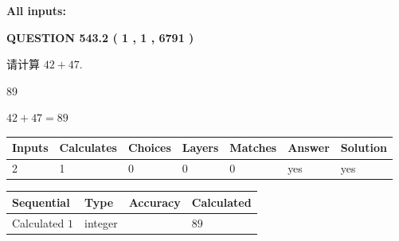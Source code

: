 \documentclass{ctexart}
\begin{document}
   
   
   
\noindent{}
   
   
   
   
\noindent\vspace{0.1in}\hspace{-0.08in} {\textbf{\Large{All inputs: }}}
   
   
  
\vspace{0.2in}
  
{\textbf{\Large{QUESTION
543.2 
 ( 1 , 1 , 6791 )
}}}
  
  
 
请计算 $ %
42 +  %
47 $.
 
 
 
\noindent{}
 
 

89
 
 
\noindent{}
 
 

 
 
 
\noindent{}
 
 

$ %
42 +  %
47=   %
89$
 
 
\noindent{}
 
 

 
   
   
   
   
\noindent\begin{tabular}{|l|l|l|l|l|l|l|}
 \hline
Inputs & Calculates & Choices & Layers & Matches & Answer & Solution \\ \hline
 2  & 
 1  & 
 0
  & 
 0  & 
 0  & 
  yes & 
  yes 
  \\ \hline
 \end{tabular}
   
   
   
   
\noindent{}
   
   
  
  
\noindent\begin{tabular}{|l|l|l|l|}
\hline
 Sequential & Type & Accuracy & Calculated \\ 
\hline
 
 
  Calculated $  1 $ & integer &  & 
  $ 89 $ 
 \\  \hline  
 \end{tabular}
   
\end{document}
